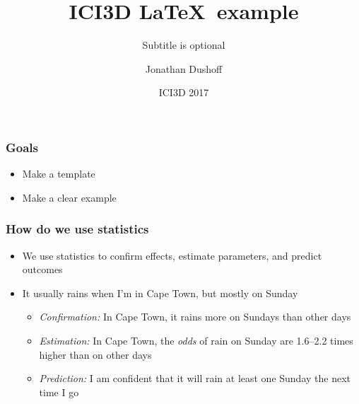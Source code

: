 \documentclass{beamer}
\begin{document}
\title{ICI3D \LaTeX\ example}
\subtitle{Subtitle is optional}
\author{Jonathan Dushoff}
\date{ICI3D 2017}
\newcommand{\years}{2017}



\begin{frame}

\frametitle{Goals}

\begin{itemize}

\item Make a template

\item Make a clear example



\end{itemize}

\end{frame}
\begin{frame}

\frametitle{How do we use statistics}

\begin{itemize}

	\item We use statistics to confirm effects, estimate parameters, and
		predict outcomes

	\item It usually rains when I'm in Cape Town, but mostly on Sunday

	\begin{itemize}

		\item \emph{Confirmation:} In Cape Town, it rains more on Sundays than
				other days

		\item \emph{Estimation:} In Cape Town, the \emph{odds} of rain on
				Sunday are 1.6--2.2 times higher than on other days

		\item \emph{Prediction:} I am confident that it will rain at least one
				Sunday the next time I go

	\end{itemize}

\end{itemize}

\end{frame}
\end{document}
